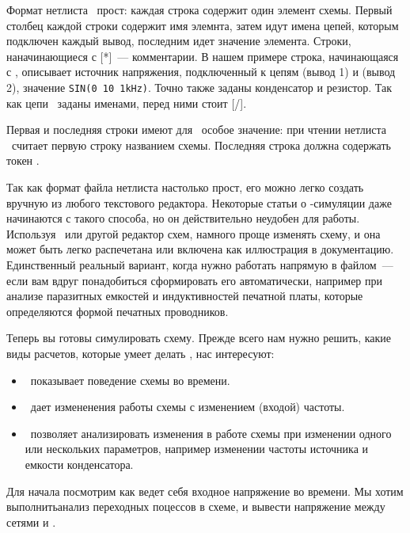 Формат нетлиста \spice\ прост: каждая строка содержит один элемент схемы.
Первый столбец каждой строки содержит имя элемнта, затем идут имена цепей,
которым подключен каждый вывод, последним идет значение элемента.
Строки, наначинающиеся с [*]\ --- комментарии.
В нашем примере строка, начинающаяся с , описывает источник напряжения,
подключенный к цепям  (вывод 1) и  (вывод 2), значение
\verb|SIN(0 10 1kHz)|. Точно также заданы конденсатор и резистор. Так как цепи
\ заданы именами, перед ними стоит [/].

Первая и последняя строки имеют для \ngs\ особое значение: при чтении нетлиста
\ngs\ считает первую строку названием схемы. Последняя строка должна содержать
токен .

Так как формат файла нетлиста настолько прост, его можно легко создать вручную
из любого текстового редактора. Некоторые статьи о \spice-симуляции даже
начинаются с такого способа, но он действительно неудобен для работы. Используя
\eeschema\ или другой редактор схем, намного проще изменять схему, и она может
быть легко распечетана или включена как иллюстрация в документацию. Единственный
реальный вариант, когда нужно работать напрямую в файлом\ --- если вам вдруг
понадобиться сформировать его автоматически, например при анализе паразитных
емкостей и индуктивностей печатной платы, которые определяются формой печатных
проводников.


Теперь вы готовы симулировать схему. Прежде всего нам нужно решить, какие виды
расчетов, которые умеет делать \spice, нас интересуют:

\begin{itemize}
  \item {}\ показывает поведение
  схемы во времени.
  \item {}\ дает измененения работы схемы с
  изменением (входой) частоты.
  \item {}\ позволяет анализировать изменения в
  работе схемы при изменении одного или нескольких параметров, например
  изменении частоты источника и емкости конденсатора.
\end{itemize}

Для начала посмотрим как ведет себя входное напряжение во времени. Мы хотим
выполнитьанализ переходных поцессов в схеме, и вывести напряжение между сетями
 и .

